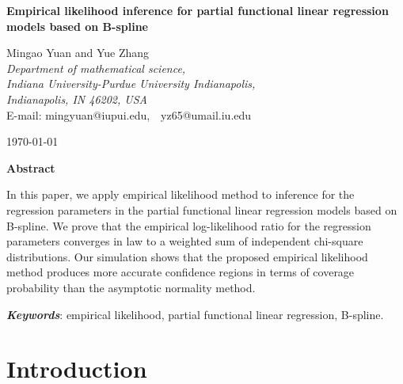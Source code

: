 \documentclass[preprint,12pt]{elsarticle}
\begin{document}
	\begin{center}
	\large \bf	Empirical likelihood inference for partial functional linear regression models based on B-spline
	\end{center}
	
	\vspace*{1\baselineskip} 
	
	\begin{center}
		 Mingao Yuan and Yue Zhang\\
			\vspace*{1\baselineskip} 
		\textit{Department of mathematical science,}\\
		\textit{Indiana University-Purdue University Indianapolis,}\\
		\textit{Indianapolis, IN 46202, USA}\\
		E-mail:  mingyuan@iupui.edu,\ \ yz65@umail.iu.edu
		
	\end{center}

\begin{center}	
\today	
\end{center}
	
	

	\vspace*{1\baselineskip} 
	
\begin{center}	
	\bf Abstract	
\end{center}


In this paper, we apply empirical likelihood method to inference for the regression parameters in the partial functional linear regression models based on B-spline. We prove that the empirical log-likelihood ratio for the regression parameters converges in law to a weighted sum of independent chi-square distributions. Our simulation shows that the proposed empirical likelihood method produces more accurate confidence regions in terms of coverage probability than the asymptotic normality method.





{\bf \textit{ Keywords}}: empirical likelihood, partial functional linear regression, B-spline.


	 
	 
	\section{Introduction}
	
\end{document}
